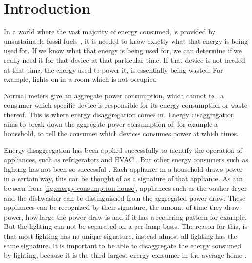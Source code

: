 
\chapter{Introduction}
\label{chp:introduction}

\vspace{1\baselineskip}

\noindent


In a world where the vast majority of energy consumed, is provided by unsustainable fossil fuels~\cite{kolter2011redd}, it is needed to know exactly what that energy is being used for. 
If we know what that energy is being used for, we can determine if we really need it for that device at that particular time.
If that device is not needed at that time, the energy used to power it, is essentially being wasted.
For example, lights on in a room which is not occupied.



Normal meters give an aggregate power consumption, which cannot tell a consumer which specific device is responsible for its energy consumption or waste thereof.
This is where energy disaggregation comes in.
Energy disaggregation aims to break down the aggregate power consumption of, for example a household, to tell the consumer which devices consumes power at which times.




Energy disaggregation has been applied successfully to identify the operation of appliances, such as refrigerators and HVAC \cite{kolter2011redd} \cite{spiegel2014energy}.
But other energy consumers such as lighting has not been so successful \cite{spiegel2014energy} \cite{batra2015neighbourhood}.
Each appliance in a household draws power in a certain way, this can be thought of as a signature of that appliance.
As can be seen from \autoref{fig:energy-consumption-house}, appliances such as the washer dryer and the dishwasher can be distinguished from the aggregated power draw.
These appliances can be recognized by their signature, the amount of time they draw power, how large the power draw is and if it has a recurring pattern for example.
But the lighting can not be separated on a per lamp basis.
The reason for this, is that most lighting has no unique signature, instead almost all lighting has the same signature.
It is important to be able to disaggregate the energy consumed by lighting, because it is the third largest energy consumer in the average home \cite{batra2015neighbourhood}.

